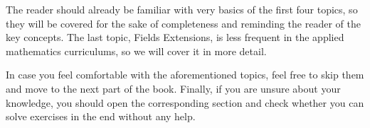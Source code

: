 \documentclass[../../../book]{subfiles}
\begin{document}
The reader should already be familiar with very basics of the first four topics,
so they will be covered for the sake of completeness and reminding the reader of
the key concepts. The last topic, Fields Extensions, is less frequent in 
the applied mathematics curriculums, so we will cover it in more detail.

In case you feel comfortable with the aforementioned topics, feel free to skip 
them and move to the next part of the book. Finally, if you are unsure about 
your knowledge, you should open the corresponding section and check whether 
you can solve exercises in the end without any help.
\end{document}
